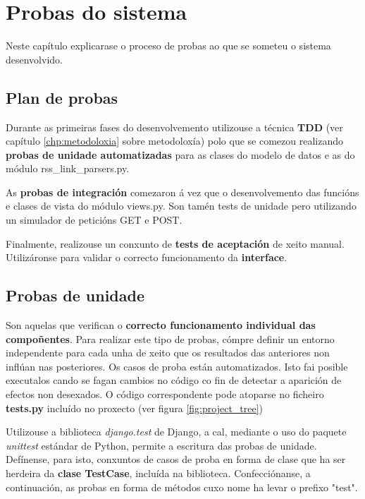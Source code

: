 \chapter[Probas do sistema]{
  \label{chp:test}
  Probas do sistema
}
\minitoc
\newpage

Neste capítulo explicarase o proceso de probas ao que se someteu o sistema desenvolvido. 

\section{Plan de probas}

Durante as primeiras fases do desenvolvemento utilizouse a técnica \textbf{TDD} (ver capítulo \ref{chp:metodoloxia} sobre metodoloxía) polo que se comezou realizando \textbf{probas de unidade automatizadas} para as clases do modelo de datos e as do módulo rss\_link\_parsers.py.

As \textbf{probas de integración} comezaron á vez que o desenvolvemento das funcións e clases de vista do módulo views.py. Son tamén tests de unidade pero utilizando un simulador de peticións GET e POST.

Finalmente, realizouse un conxunto de \textbf{tests de aceptación} de xeito manual. Utilizáronse para validar o correcto funcionamento da \textbf{interface}.


\section{Probas de unidade}

Son aquelas que verifican o \textbf{correcto funcionamento individual das compoñentes}. Para realizar este tipo de probas, cómpre definir un entorno independente para cada unha de xeito que os resultados das anteriores non inflúan nas posteriores. Os casos de proba están automatizados. Isto fai posible executalos cando se fagan cambios no código co fin de detectar a aparición de efectos non desexados. O código correspondente pode atoparse no ficheiro \textbf{tests.py} incluído no proxecto (ver figura \ref{fig:project_tree})

Utilizouse a biblioteca \textit{django.test} de Django, a cal, mediante o uso do paquete \textit{unittest} estándar de Python, permite a escritura das probas de unidade. Defínense, para isto, conxuntos de casos de proba en forma de clase que ha ser herdeira da \textbf{clase TestCase}, incluída na biblioteca. Confecciónanse, a continuación, as probas en forma de métodos cuxo nome ha levar o prefixo "test".

